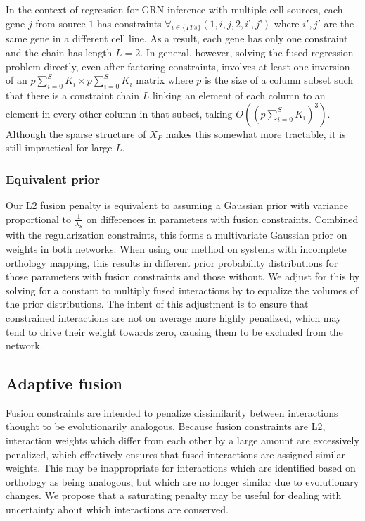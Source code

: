 \documentclass[11pt]{article}
\begin{document}
In the context of regression for GRN inference with multiple cell sources, each gene $j$ from source $1$ has constraints $\forall_{i \in \{TFs\}} (1, i, j, 2, i’, j’)$ where $i',j'$ are the same gene in a different cell line.
As a result, each gene has only one constraint and the chain has length $L=2$.
In general, however, solving the fused regression problem directly, even after factoring constraints, involves at least one inversion of an $p\sum_{i=0}^S K_i \times p \sum_{i=0}^S K_i$ matrix where $p$ is the size of a column subset such that there is a constraint chain $L$ linking an element of each column to an element in every other column in that subset, taking $O((p\sum_{i=0}^S K_i)^3)$.
Although the sparse structure of $X_P$ makes this somewhat more tractable, it is still impractical for large $L$.


\subsubsection{Equivalent prior}
Our L2 fusion penalty is equivalent to assuming a Gaussian prior with variance proportional to $\frac{1}{\lambda_S}$ on differences in parameters with fusion constraints. Combined with the regularization constraints, this forms a multivariate Gaussian prior on weights in both networks. When using our method on systems with incomplete orthology mapping, this results in different prior probability distributions for those parameters with fusion constraints and those without. We adjust for this by solving for a constant to multiply fused interactions by to equalize the volumes of the prior distributions. The intent of this adjustment is to ensure that constrained interactions are not on average more highly penalized, which may tend to drive their weight towards zero, causing them to be excluded from the network. 

\subsection{Adaptive fusion}
Fusion constraints are intended to penalize dissimilarity between interactions thought to be evolutionarily analogous. Because fusion constraints are L2, interaction weights which differ from each other by a large amount are excessively penalized, which effectively ensures that fused interactions are assigned similar weights. This may be inappropriate for interactions which are identified based on orthology as being analogous, but which are no longer similar due to evolutionary changes. We propose that a saturating penalty may be useful for dealing with uncertainty about which interactions are conserved. 
\end{document}
